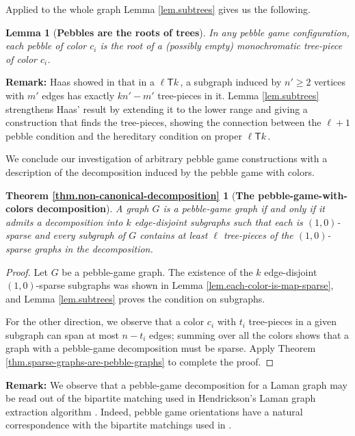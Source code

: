 \documentclass[Svgc,nospthms]{Svgc}
\newcommand{\ellteekay}{\ensuremath{\ell{\mathsf T}k}\,}
\newtheorem{lemma}[theorem]{Lemma}
\newcommand{\reflem}[1]{Lemma \ref{lem.#1}}
\newcommand{\refthm}[1]{Theorem \ref{thm.#1}}
\newcommand{\labellem}[1]{\label{lem.#1}}
\newcommand{\restateenv}{ZZZ}
\newenvironment{restate}[1]{
  \renewcommand{\restateenv}{restate.#1}
  \newtheorem*{\restateenv}{\refthm{#1}}
  \begin{\restateenv}
}{\end{\restateenv}}
\begin{document}
Applied to the whole graph \reflem{subtrees} gives us the following.

\begin{lemma}[{\bf Pebbles are the roots of trees}]\labellem{roots}
In any pebble game configuration, each pebble of color $c_i$ is the 
root of a (possibly empty) monochromatic tree-piece of color $c_i$.
\end{lemma}

{\bf Remark:}  Haas showed in \cite{haas:2002} that in a \ellteekay, a 
subgraph induced by $n'\ge 2$ vertices with $m'$ edges has exactly $kn'-m'$
tree-pieces in it.  \reflem{subtrees} strengthens Haas' result by extending it 
to the lower range and giving a construction that finds the tree-pieces, showing 
the connection between the $\ell+1$ pebble condition and the hereditary 
condition on proper \ellteekay. 

We conclude our investigation of arbitrary pebble game constructions 
with a description of the decomposition induced by the pebble game with colors.
	
\begin{restate}{non-canonical-decomposition}[{\bf The pebble-game-with-colors decomposition}] 
		A graph $G$ is a pebble-game graph if and only if it admits a decomposition into $k$	
		edge-disjoint subgraphs such that each  is $(1,0)$-sparse and every subgraph of $G$ 
		contains at least $\ell$  tree-pieces of the $(1,0)$-sparse graphs in the decomposition.
\end{restate}
	
\begin{proof}
Let $G$ be a pebble-game graph.  The existence of the $k$ edge-disjoint
$(1,0)$-sparse subgraphs was shown in  \reflem{each-color-is-map-sparse}, and
\reflem{subtrees} proves the condition on subgraphs.

For the other direction, we observe that a color 
$c_i$ with $t_i$ tree-pieces in a given subgraph can span at most $n-t_i$
edges; summing over all the colors shows that a graph with a pebble-game decomposition
must be sparse.  Apply \refthm{sparse-graphs-are-pebble-graphs} to complete the proof.
 \end{proof}
	
{\bf Remark: } We observe that a pebble-game decomposition for a 
Laman graph may be 
read out of the bipartite matching used in Hendrickson's Laman graph 
extraction algorithm \cite{hendrickson:uniqueRealizability:1992}.  
Indeed, pebble game orientations have a natural 
correspondence with the bipartite matchings used in 
\cite{hendrickson:uniqueRealizability:1992}.
\end{document}
